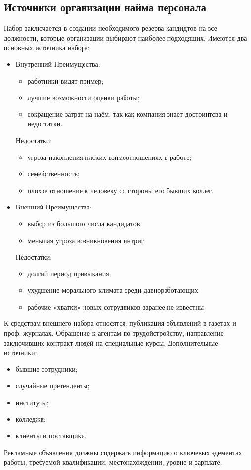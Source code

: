 \documentclass[a4paper,12pt,oneside,final]{extarticle}
\numberwithin{equation}{section}
\begin{document}
\subsection{Источники организации найма персонала}
Набор заключается в создании необходимого резерва кандидтов на все должности, которые организации выбирают наиболее подходящих. 
Имеются два основных источника набора:
\begin{itemize}

	\item Внутренний 
	Преимущества:  
	\begin{itemize}
		\item работники видят пример;
		\item лучшие возможности оценки работы;
		\item сокращение затрат на наём, так как компания знает достоинтсва и недостатки.
	\end{itemize}
	Недостатки:
	\begin{itemize}
		\item угроза накопления плохих взимоотношениях в работе;
		\item семейственность;
		\item плохое отношение к человеку со стороны его бывших коллег.
	\end{itemize}

	\item Внешний 
	Преимущества:  
	\begin{itemize}
		\item выбор из большого числа кандидатов
		\item меньшая угроза возникновения интриг
	\end{itemize}
	Недостатки:
	\begin{itemize}
		\item долгий период привыкания
		\item ухудшение морального климата среди давноработающих
		\item рабочие «хватки» новых сотрудников заранее не известны
	\end{itemize}
\end{itemize}
К средствам внешнего набора относятся: публикация объявлений в газетах и проф. журналах. 
Обращение к агентам по трудойстройству, направление заключивших контракт людей на специальные курсы. 
Дополнительные источники: 
\begin{itemize}
	\item бывшие сотрудники;
	\item случайные претенденты;
	\item институты;
	\item колледжи;
	\item клиенты и поставщики.
\end{itemize} 
Рекламные объявления должны содержать информацию о ключевых эдементах работы, требуемой квалификации, местонахождении, уровне и зарплате.
\end{document}
